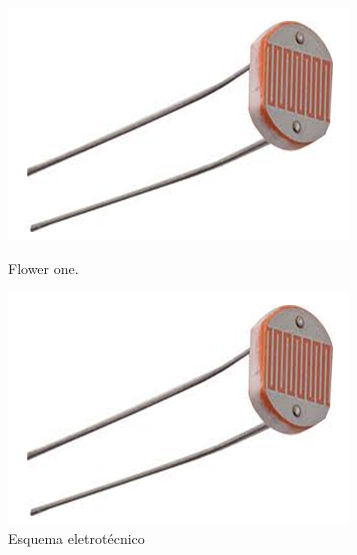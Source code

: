 \begin{figure}[h]
	\centering
	\begin{minipage}[b]{0.4\textwidth}
		\includegraphics[width=\textwidth]{img/hardware/luminosidade.png}
		\caption{Flower one.}
	\end{minipage}
	\hfill
	\begin{minipage}[b]{0.4\textwidth}
		\includegraphics[width=\textwidth]{img/hardware/luminosidade.png}
		\caption{Esquema eletrotécnico}
	\end{minipage}
\end{figure}











